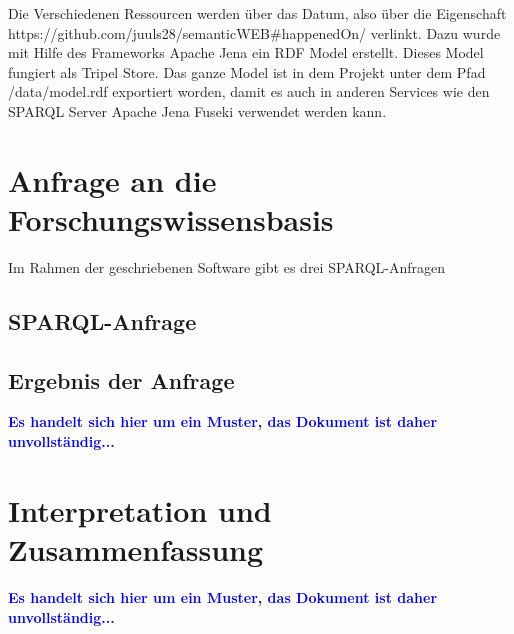 \documentclass[a4paper,10pt,parskip]{article}
\begin{document}
Die Verschiedenen Ressourcen werden über das Datum, also über die Eigenschaft https://github.com/juuls28/semanticWEB\#happenedOn/ verlinkt. Dazu wurde mit Hilfe des Frameworks Apache Jena ein RDF Model erstellt. Dieses Model fungiert als Tripel Store. Das ganze Model ist in dem Projekt unter dem Pfad /data/model.rdf exportiert worden, damit es auch in anderen Services wie den SPARQL Server Apache Jena Fuseki verwendet werden kann.



\section{Anfrage an die Forschungswissensbasis}
Im Rahmen der geschriebenen Software gibt es drei SPARQL-Anfragen
\subsection{SPARQL-Anfrage}

\subsection{Ergebnis der Anfrage}


\vspace{0.5cm}\textcolor{blue}{\textbf{Es handelt sich hier um ein Muster, das Dokument ist daher unvollständig...}}


\section{Interpretation und Zusammenfassung}

\vspace{0.5cm}\textcolor{blue}{\textbf{Es handelt sich hier um ein Muster, das Dokument ist daher unvollständig...}}



\end{document}
